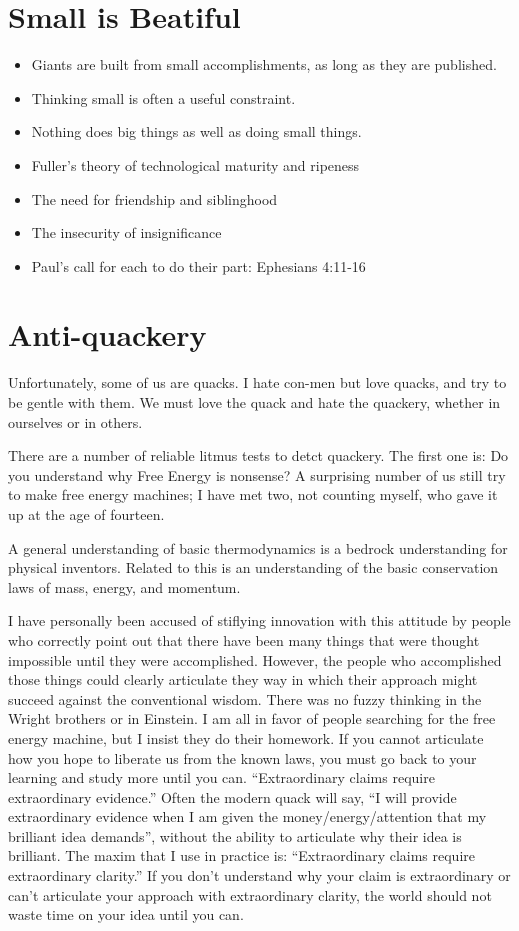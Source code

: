 \documentclass[
	fontsize=10pt, %
	twoside=false, %
	secnumdepth=1, %
]{kaobook}
\begin{document}
\section{Small is Beatiful}

\begin{itemize}
\item Giants are built from small accomplishments, as long as they are published.
\item Thinking small is often a useful constraint.
\item Nothing does big things as well as doing small things.
\item Fuller’s theory of technological maturity and ripeness
\item The need for friendship and siblinghood
\item The insecurity of insignificance
\item Paul’s call for each to do their part: Ephesians 4:11-16
\end{itemize}

\section{Anti-quackery}

Unfortunately, some of us are quacks.
I hate con-men but love quacks, and try to be gentle with them.
We must love the quack and hate the quackery, whether in ourselves
or in others.

There are a number of reliable litmus tests to detct quackery.
The first one is: Do you understand why Free Energy is nonsense?
A surprising number of us still try to make free energy machines;
I have met two, not counting myself, who gave it up at the age of fourteen.

A general understanding of basic thermodynamics is a bedrock
understanding for physical inventors.
Related to this is an understanding of the basic conservation laws
of mass, energy, and momentum.

I have personally been accused of stiflying innovation with
this attitude by people who correctly point out that there have
been many things that were thought impossible until they were accomplished.
However, the people who accomplished those things could clearly
articulate they way in which their approach might succeed against
the conventional wisdom. There was no fuzzy thinking in the
Wright brothers or in Einstein. I am all in favor of
people searching for the free energy machine, but I insist
they do their homework.
If you cannot articulate how you hope to liberate us from the
known laws, you must go back to your learning and study more
until you can. ``Extraordinary claims require extraordinary
evidence.'' Often the modern quack will say, ``I will
provide extraordinary evidence when I am given the
money/energy/attention that my brilliant idea demands'',
without the ability to articulate why their idea is brilliant.
The maxim that I use in practice is: ``Extraordinary claims require
extraordinary clarity.''
If you don't understand why your claim is extraordinary or
can't articulate your approach with extraordinary clarity,
the world should not waste time on your idea until you can.
\end{document}
